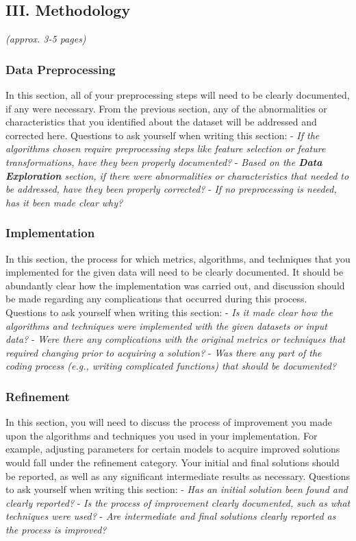 \documentclass[]{article}
\begin{document}
\subsection{III. Methodology}\label{iii.-methodology}

\emph{(approx. 3-5 pages)}

\subsubsection{Data Preprocessing}\label{data-preprocessing}

In this section, all of your preprocessing steps will need to be clearly
documented, if any were necessary. From the previous section, any of the
abnormalities or characteristics that you identified about the dataset
will be addressed and corrected here. Questions to ask yourself when
writing this section: - \emph{If the algorithms chosen require
preprocessing steps like feature selection or feature transformations,
have they been properly documented?} - \emph{Based on the \textbf{Data
Exploration} section, if there were abnormalities or characteristics
that needed to be addressed, have they been properly corrected?} -
\emph{If no preprocessing is needed, has it been made clear why?}

\subsubsection{Implementation}\label{implementation}

In this section, the process for which metrics, algorithms, and
techniques that you implemented for the given data will need to be
clearly documented. It should be abundantly clear how the implementation
was carried out, and discussion should be made regarding any
complications that occurred during this process. Questions to ask
yourself when writing this section: - \emph{Is it made clear how the
algorithms and techniques were implemented with the given datasets or
input data?} - \emph{Were there any complications with the original
metrics or techniques that required changing prior to acquiring a
solution?} - \emph{Was there any part of the coding process (e.g.,
writing complicated functions) that should be documented?}

\subsubsection{Refinement}\label{refinement}

In this section, you will need to discuss the process of improvement you made upon the algorithms and techniques you used in your implementation.
For example, adjusting parameters for certain models to acquire improved solutions would fall under the refinement category. Your initial and final solutions should be reported, as well as any significant intermediate results as necessary. Questions to ask yourself when writing this section: - \emph{Has an initial solution been found and clearly reported?} - \emph{Is the process of improvement clearly documented, such as what techniques were used?} - \emph{Are intermediate and final solutions clearly reported as the process is improved?}
\end{document}
